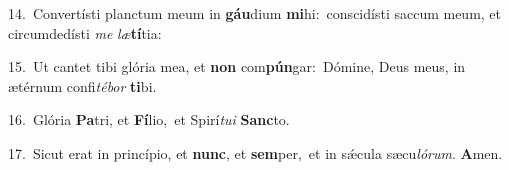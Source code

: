 {\numbfont\textcolor{\numbcolor}{14.}}~Convertísti planctum meum in \textbf{gáu}\-dium \textbf{mi}\-hi:~\star conscidísti saccum meum, et circumdedísti \textit{me} \textit{læ}\-\textbf{tí}tia:\par
{\numbfont\textcolor{\numbcolor}{15.}}~Ut cantet tibi glória mea, et \textbf{non} com\-\textbf{pún}\-gar:~\star Dómine, Deus meus, in ætérnum confi\-\textit{té}\-\textit{bor} \textbf{ti}\-bi.\par
{\numbfont\textcolor{\numbcolor}{16.}}~Glória \textbf{Pa}\-tri, et \textbf{Fí}\-lio,~\star et Spirí\-\textit{tu}\-\textit{i} \textbf{Sanc}\-to.\par
{\numbfont\textcolor{\numbcolor}{17.}}~Sicut erat in princípio, et \textbf{nunc}\-, et \textbf{sem}\-per,~\star et in sǽcula sæcu\-\textit{ló}\-\textit{rum}. \textbf{A}\-men.\par
